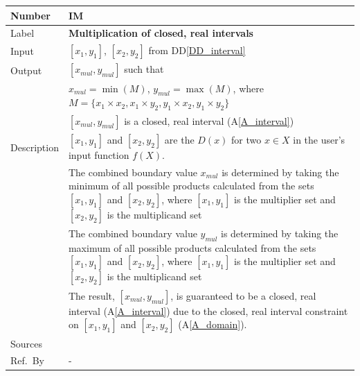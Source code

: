 \documentclass[12pt]{article}
\newcommand{\colAwidth}{0.13\textwidth}
\newcommand{\colBwidth}{0.82\textwidth}
\newcommand{\ddref}[1]{DD\ref{#1}}
\newcommand{\aref}[1]{A\ref{#1}}
\newcounter{instnum} %
\begin{document}
\noindent
\begin{minipage}{\textwidth}
	\renewcommand*{\arraystretch}{1.5}
	\begin{tabular}{| p{\colAwidth} | p{\colBwidth}|}
		\hline
		\rowcolor[gray]{0.9}
		Number& IM{instnum}\theinstnum \label{I_multiplication}\\
		\hline
		Label& \bf Multiplication of closed, real intervals\\
		\hline
		Input&$[x_{1}, y_{1}]$, $[x_{2}, y_{2}]$ from \ddref{DD_interval}\\
		\hline
		Output&$[x_{mul}, y_{mul}]$ such that\\
		&$x_{mul} = \min(M)$, $y_{mul} = \max(M)$, where $M = \{x_{1} \times 
		x_{2}, x_{1} \times y_{2}, y_{1} \times x_{2}, y_{1} \times y_{2}\}$\\
		&$[x_{mul}, y_{mul}]$ is a closed, real interval (\aref{A_interval}) \\
		\hline
		Description&$[x_{1}, y_{1}]$ and $[x_{2}, y_{2}]$ are the $D(x)$ for 
		two $x \in X$ in the user's input function $f(X)$. \\
		&The combined boundary value $x_{mul}$ is determined by taking the 
		minimum of all possible products calculated from the sets $[x_{1}, 
		y_{1}]$ and $[x_{2}, y_{2}]$, where $[x_{1}, y_{1}]$ is the 
		multiplier set and $[x_{2}, y_{2}]$ is the multiplicand set\\
		&The combined boundary value $y_{mul}$ is determined by taking the 
		maximum of all possible products calculated from the sets $[x_{1}, 
		y_{1}]$ and $[x_{2}, y_{2}]$, where $[x_{1}, y_{1}]$ is the 
		multiplier set and $[x_{2}, y_{2}]$ is the multiplicand set\\
		& The result, $[x_{mul}, y_{mul}]$, is guaranteed to be a closed, real 
		interval (\aref{A_interval}) due to the closed, real interval 
		constraint on $[x_{1}, y_{1}]$ and $[x_{2}, y_{2}]$ (\aref{A_domain}).
		\\
		\hline
		Sources& ~\cite{intervalarithmetic} \ \\
		\hline
		Ref.\ By & -\\
		\hline
	\end{tabular}
\end{minipage}\\

~\newline
\end{document}
